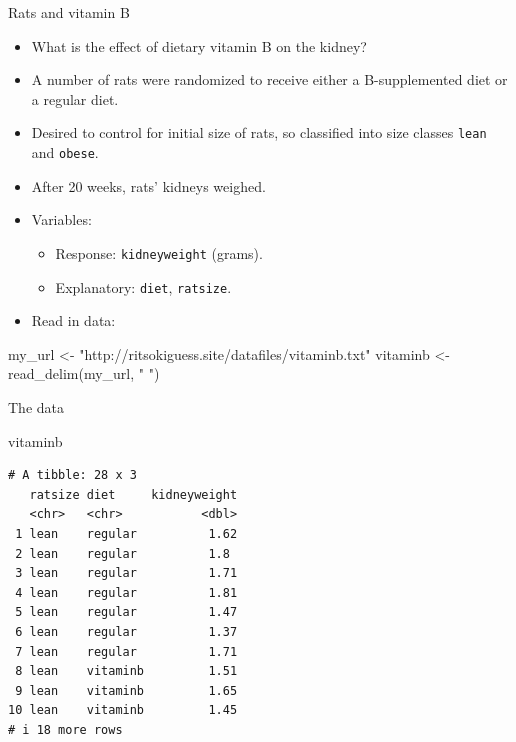 \documentclass[
  ignorenonframetext,
]{beamer}
\newenvironment{Shaded}{\begin{snugshade}}{\end{snugshade}}
\newcommand{\FunctionTok}[1]{\textcolor[rgb]{0.28,0.35,0.67}{#1}}
\newcommand{\NormalTok}[1]{\textcolor[rgb]{0.00,0.23,0.31}{#1}}
\newcommand{\OtherTok}[1]{\textcolor[rgb]{0.00,0.23,0.31}{#1}}
\newcommand{\StringTok}[1]{\textcolor[rgb]{0.13,0.47,0.30}{#1}}
\begin{document}
\begin{frame}[fragile]{Rats and vitamin B}
\protect\hypertarget{rats-and-vitamin-b}{}
\begin{itemize}
\item
  What is the effect of dietary vitamin B on the kidney?
\item
  A number of rats were randomized to receive either a B-supplemented
  diet or a regular diet.
\item
  Desired to control for initial size of rats, so classified into size
  classes \texttt{lean} and \texttt{obese}.
\item
  After 20 weeks, rats' kidneys weighed.
\item
  Variables:

  \begin{itemize}
  \item
    Response: \texttt{kidneyweight} (grams).
  \item
    Explanatory: \texttt{diet}, \texttt{ratsize}.
  \end{itemize}
\item
  Read in data:
\end{itemize}

\small

\begin{Shaded}
\begin{Highlighting}[]
\NormalTok{my\_url }\OtherTok{\textless{}{-}} \StringTok{"http://ritsokiguess.site/datafiles/vitaminb.txt"}
\NormalTok{vitaminb }\OtherTok{\textless{}{-}} \FunctionTok{read\_delim}\NormalTok{(my\_url, }\StringTok{" "}\NormalTok{)}
\end{Highlighting}
\end{Shaded}

\normalsize
\end{frame}

\begin{frame}[fragile]{The data}
\protect\hypertarget{the-data-1}{}
\begin{Shaded}
\begin{Highlighting}[]
\NormalTok{vitaminb}
\end{Highlighting}
\end{Shaded}

\begin{verbatim}
# A tibble: 28 x 3
   ratsize diet     kidneyweight
   <chr>   <chr>           <dbl>
 1 lean    regular          1.62
 2 lean    regular          1.8 
 3 lean    regular          1.71
 4 lean    regular          1.81
 5 lean    regular          1.47
 6 lean    regular          1.37
 7 lean    regular          1.71
 8 lean    vitaminb         1.51
 9 lean    vitaminb         1.65
10 lean    vitaminb         1.45
# i 18 more rows
\end{verbatim}
\end{frame}
\end{document}
